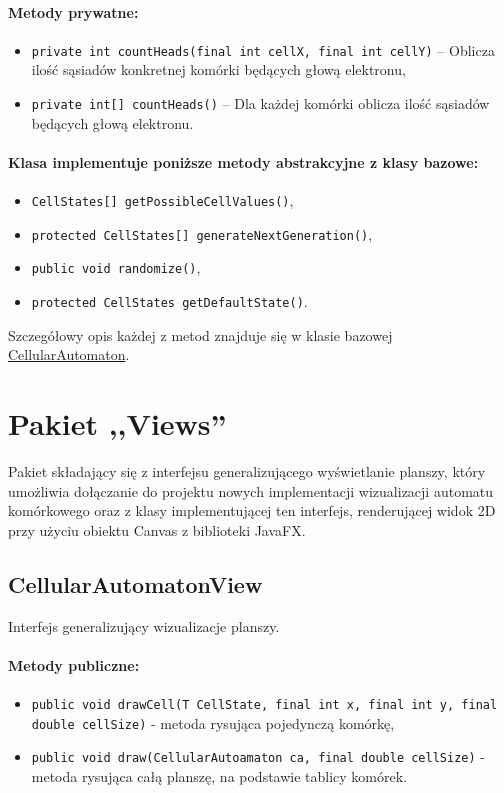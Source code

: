 \documentclass{report}
\begin{document}
\paragraph{Metody prywatne:}
\begin{itemize}
    \item \texttt{private int countHeads(final int cellX, final int cellY)} -- Oblicza ilość sąsiadów konkretnej komórki będących głową elektronu,
    \item \texttt{private int[] countHeads()} -- Dla każdej komórki oblicza ilość sąsiadów będących głową elektronu.
\end{itemize}

\paragraph{Klasa implementuje poniższe metody abstrakcyjne z klasy bazowe:}
\begin{itemize}
    \item \texttt{CellStates[] getPossibleCellValues()},
    \item \texttt{protected CellStates[] generateNextGeneration()},
    \item \texttt{public void randomize()},
    \item \texttt{protected CellStates getDefaultState()}.
\end{itemize}
Szczegółowy opis każdej z metod znajduje się w klasie bazowej \hyperref[subsec:cellularAutomaton]{CellularAutomaton}.

\section{Pakiet ,,Views''}
Pakiet składający się z interfejsu generalizującego wyświetlanie planszy, który umożliwia dołączanie do projektu nowych implementacji wizualizacji automatu komórkowego oraz z klasy implementującej ten interfejs, renderującej widok 2D przy użyciu obiektu Canvas z biblioteki JavaFX.
\subsection{CellularAutomatonView}
Interfejs generalizujący wizualizacje planszy.
\paragraph{Metody publiczne:}
\begin{itemize}
	\item \texttt{public void drawCell(T CellState, final int x, final int y, final double cellSize)} - metoda rysująca pojedynczą komórkę,
	\item \texttt{public void draw(CellularAutoamaton ca, final double cellSize)} - metoda rysująca całą planszę, na podstawie tablicy komórek.
\end{itemize}
\end{document}

